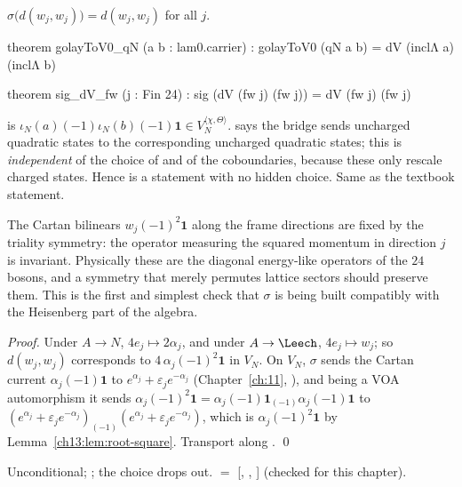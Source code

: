 \begin{theorem}\label{ch13:thm:sig-dV-fw}
$\sigma\bigl(d(w_j,w_j)\bigr)=d(w_j,w_j)$ for all $j$.
\end{theorem}
\begin{leancode}
theorem golayToV0_qN (a b : lam0.carrier) : golayToV0 (qN a b) = dV (inclΛ a) (inclΛ b)

theorem sig_dV_fw (j : Fin 24) : sig (dV (fw j) (fw j)) = dV (fw j) (fw j)
\end{leancode}
\begin{dictionary}
 is $\iota_N(a)(-1)\iota_N(b)(-1)\mathbf 1\in V_N^{\langle\chi,\Theta\rangle}$.  says the
bridge sends uncharged quadratic states to the corresponding uncharged quadratic states; this is
\emph{independent} of the choice of  and of the coboundaries, because these only rescale
charged states. Hence  is a statement with no hidden choice. Same as the textbook
statement.
\end{dictionary}
\begin{physics}
The Cartan bilinears $w_j(-1)^2\mathbf 1$ along the frame directions are fixed by the triality symmetry: the operator measuring the squared momentum in direction $j$ is invariant. Physically these are the diagonal energy-like operators of the $24$ bosons, and a symmetry that merely permutes lattice sectors should preserve them. This is the first and simplest check that $\sigma$ is being built compatibly with the Heisenberg part of the algebra.
\end{physics}
\noindent\emph{Proof.} Under $A\to N$, $4e_j\mapsto 2\alpha_j$, and under $A\to\Leech$, $4e_j\mapsto w_j$; so
$d(w_j,w_j)$ corresponds to $4\,\alpha_j(-1)^2\mathbf 1$ in $V_N$. On $V_N$, $\sigma$ sends the Cartan current
$\alpha_j(-1)\mathbf 1$ to $e^{\alpha_j}+\varepsilon_je^{-\alpha_j}$ (Chapter~\ref{ch:11}, ), and being a VOA
automorphism it sends $\alpha_j(-1)^2\mathbf 1=\alpha_j(-1)\mathbf1_{(-1)}\alpha_j(-1)\mathbf 1$ to
$(e^{\alpha_j}+\varepsilon_je^{-\alpha_j})_{(-1)}(e^{\alpha_j}+\varepsilon_je^{-\alpha_j})$, which is $\alpha_j(-1)^2\mathbf 1$ by
Lemma~\ref{ch13:lem:root-square}. Transport along . \qed
\begin{status}Unconditional; ; the  choice drops out.
 $=$ [, , ]
(checked for this chapter).\end{status}

